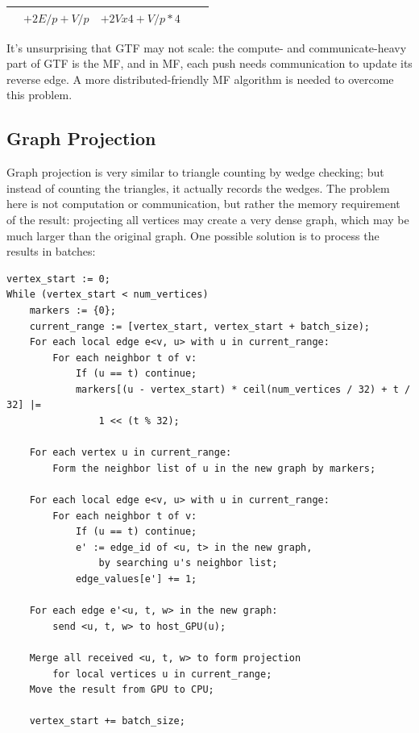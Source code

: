 \documentclass[10pt,oneside]{memoir}
\begin{document}
\begin{longtable}[]{@{}lllll@{}}
\begin{minipage}[t]{0.09\columnwidth}
\strut
\end{minipage} & \begin{minipage}[t]{0.15\columnwidth}\raggedright
\(+ 2E/p + V/p\)\strut
\end{minipage} & \begin{minipage}[t]{0.19\columnwidth}\raggedright
\(+ 2V x 4 + V/p * 4\)\strut
\end{minipage} & \begin{minipage}[t]{0.27\columnwidth}\raggedright
\strut
\end{minipage} & \begin{minipage}[t]{0.16\columnwidth}\raggedright
\strut
\end{minipage}\tabularnewline
\bottomrule
\end{longtable}

It's unsurprising that GTF may not scale: the compute- and
communicate-heavy part of GTF is the MF, and in MF, each push needs
communication to update its reverse edge. A more distributed-friendly MF
algorithm is needed to overcome this problem.

\hypertarget{graph-projection}{%
\subsection{Graph Projection}\label{graph-projection}}

Graph projection is very similar to triangle counting by wedge checking;
but instead of counting the triangles, it actually records the wedges.
The problem here is not computation or communication, but rather the
memory requirement of the result: projecting all vertices may create a
very dense graph, which may be much larger than the original graph. One
possible solution is to process the results in batches:

\begin{verbatim}
vertex_start := 0;
While (vertex_start < num_vertices)
    markers := {0};
    current_range := [vertex_start, vertex_start + batch_size);
    For each local edge e<v, u> with u in current_range:
        For each neighbor t of v:
            If (u == t) continue;
            markers[(u - vertex_start) * ceil(num_vertices / 32) + t / 32] |=
                1 << (t % 32);

    For each vertex u in current_range:
        Form the neighbor list of u in the new graph by markers;

    For each local edge e<v, u> with u in current_range:
        For each neighbor t of v:
            If (u == t) continue;
            e' := edge_id of <u, t> in the new graph,
                by searching u's neighbor list;
            edge_values[e'] += 1;

    For each edge e'<u, t, w> in the new graph:
        send <u, t, w> to host_GPU(u);

    Merge all received <u, t, w> to form projection
        for local vertices u in current_range;
    Move the result from GPU to CPU;

    vertex_start += batch_size;
\end{verbatim}
\end{document}
